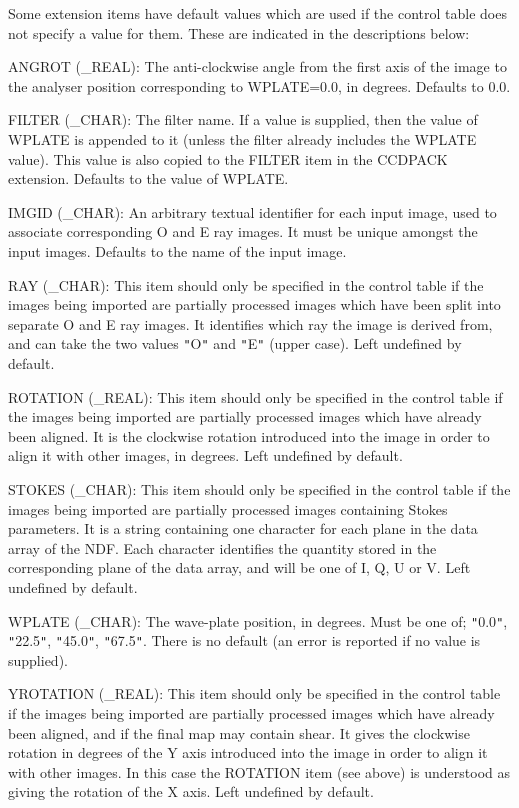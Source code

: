 {{      Some extension items have default values which are used if the
      control table does not specify a value for them. These are
      indicated in the descriptions below:

         ANGROT (\_REAL):  The anti-clockwise angle from the first axis of
         the image to the analyser position corresponding to WPLATE=0.0,
         in degrees. Defaults to 0.0.

         FILTER (\_CHAR):  The filter name. If a value is supplied, then
         the value of WPLATE is appended to it (unless the filter already
         includes the WPLATE value). This value is also copied to the FILTER
         item in the CCDPACK extension. Defaults to the value of WPLATE.

         IMGID (\_CHAR):  An arbitrary textual identifier for each input
         image, used to associate corresponding O and E ray images. It must
         be unique amongst the input images. Defaults to the name of the
         input image.

         RAY (\_CHAR):  This item should only be specified in the control
         table if the images being imported are partially processed images
         which have been split into separate O and E ray images. It
         identifies which ray the image is derived from, and can take the
         two values {\tt "}O{\tt "} and {\tt "}E{\tt "} (upper case). Left undefined by default.

         ROTATION (\_REAL):  This item should only be specified in the
         control table if the images being imported are partially processed
         images which have already been aligned. It is the clockwise
         rotation introduced into the image in order to align it with other
         images, in degrees. Left undefined by default.

         STOKES (\_CHAR):  This item should only be specified in the
         control table if the images being imported are partially processed
         images containing Stokes parameters. It is a string containing one
         character for each plane in the data array of the NDF. Each
         character identifies the quantity stored in the corresponding plane
         of the data array, and will be one of I, Q, U or V. Left
         undefined by default.

         WPLATE (\_CHAR):  The wave-plate position, in degrees. Must be one
         of; {\tt "}0.0{\tt "}, {\tt "}22.5{\tt "}, {\tt "}45.0{\tt "}, {\tt "}67.5{\tt "}. There is no default (an error
         is reported if no value is supplied).

         YROTATION (\_REAL): This item should only be specified in the
         control table if the images being imported are partially processed
         images which have already been aligned, and if the final map may
         contain shear. It gives the clockwise rotation in degrees of the
         Y axis introduced into the image in order to align it with other
         images. In this case the ROTATION item (see above) is understood
         as giving the rotation of the X axis. Left undefined by default.
   }
}
